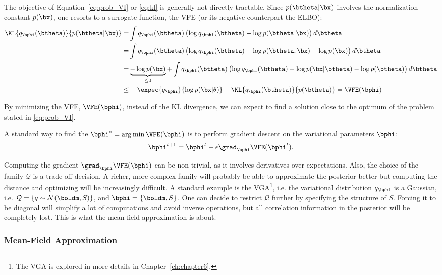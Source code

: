 The objective of Equation~\eqref{eq:prob_VI} or \eqref{eq:kl} is generally not directly tractable.
Since $p(\btheta|\bx)$ involves the normalization constant $p(\bx)$, one resorts to a surrogate function, the \ac{VFE} (or its negative counterpart the \ac{ELBO}):
\begin{align}
\KL{q_{\bphi}(\btheta)}{p(\btheta|\bx)} =& \int q_{\bphi}(\btheta) \left(\log q_{\bphi}(\btheta) - \log p(\btheta|\bx)\right)d\btheta\\
=&\int q_{\bphi}(\btheta) \left(\log q_{\bphi}(\btheta) - \log p(\btheta, \bx) - \log p(\bx)\right)d\btheta\\
=&\underbrace{- \log p(\bx)}_{\leq 0} + \int q_{\bphi}(\btheta) \left(\log q_{\bphi}(\btheta) - \log p(\bx|\btheta)- \log p(\btheta) \right)d\btheta\\
\leq& -\expec{q_{\bphi}}{\log p(\bx|\theta)} + \KL{q_{\bphi}(\btheta)}{p(\btheta)} = \VFE(\bphi)
\end{align}


By minimizing the \ac{VFE}, $\VFE(\bphi)$, instead of the \ac{KL} divergence, we can expect to find a solution close to the optimum of the problem stated in \eqref{eq:prob_VI}.

A standard way to find the $\bphi^* = \arg\min \VFE(\bphi)$ is to perform gradient descent on the variational parameters $\bphi$:
\begin{align}
\bphi^{t+1} = \bphi^{t} - \epsilon \grad_{\bphi}\VFE(\bphi^{t}).
\label{eq:vigraddescent}
\end{align}

Computing the gradient $\grad_{\bphi}\VFE(\bphi)$ can be non-trivial, as it involves derivatives over expectations.
Also, the choice of the family $\mathcal{Q}$ is a trade-off decision.
A richer, more complex family will probably be able to approximate the posterior better but computing the distance and optimizing will be increasingly difficult.
A standard example is the \ac{VGA}\footnote{The \ac{VGA} is explored in more details in Chapter~\ref{ch:chapter6}.}, i.e. the variational distribution $q_{\bphi}$ is a Gaussian, i.e. $\mathcal{Q} = \left\{q \sim \mathcal{N}(\boldm, S)\right\}$, and $\bphi = \{\boldm, S\}$.
One can decide to restrict $\mathcal{Q}$ further by specifying the structure of $S$.
Forcing it to be diagonal will simplify a lot of computations and avoid inverse operations, but all correlation information in the posterior will be completely lost.
This is what the mean-field approximation is about.

\subsubsection{Mean-Field Approximation}

